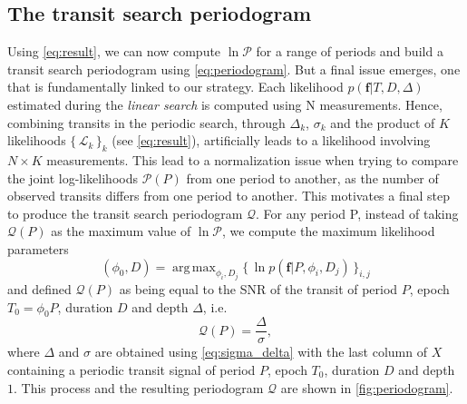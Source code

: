 \documentclass[modern]{aastex631}
\newcommand{\set}[1]{\{\,#1\,\}}
\DeclareMathOperator*{\argmax}{arg\,max}
\begin{document}
\subsection{The transit search periodogram}

Using \autoref{eq:result}, we can now compute $\ln\mathcal{P}$ for a range of periods and build a transit search periodogram using \autoref{eq:periodogram}. But a final issue emerges, one that is fundamentally linked to our strategy. Each likelihood $p(\bm{f} \vert T, D, \Delta)$ estimated during the \textit{linear search} is computed using N measurements. Hence, combining transits in the periodic search, through $\Delta_k$, $\sigma_k$ and the product of $K$ likelihoods $\set{\mathcal{L}_k}_k$ (see \autoref{eq:result}), artificially leads to a likelihood involving $N\times K$ measurements. This lead to a normalization issue when trying to compare the joint log-likelihoods $\mathcal{P}(P)$ from one period to another, as the number of observed transits differs from one period to another. This motivates a final step to produce the transit search periodogram $\mathcal{Q}$. For any period P, instead of taking $ \mathcal{Q}(P)$ as the maximum value of $\ln\mathcal{P}$, we compute the maximum likelihood parameters
\begin{equation}\label{eq:phi0}
    (\phi_0 ,D) = \argmax_{\phi_i, D_j} \set{\ln p(\bm{f} \vert P, \phi_i, D_j)}_{i, j}
\end{equation}
and defined $\mathcal{Q}(P)$ as being equal to the SNR of the transit of period $P$, epoch $T_0 = \phi_0 P$, duration $D$ and depth $\Delta$, i.e.
\begin{equation*}
    \mathcal{Q}(P) = \frac{\Delta}{\sigma},
\end{equation*}
where $\Delta$ and $\sigma$ are obtained using \autoref{eq:sigma_delta} with the last column of $X$ containing a periodic transit signal of period $P$, epoch $T_0$, duration $D$ and depth $1$. This process and the resulting periodogram $\mathcal{Q}$ are shown in \autoref{fig:periodogram}.
\end{document}
